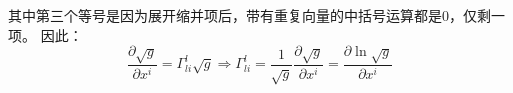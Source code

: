 \documentclass[UTF8,zihao=5]{ctexart}
\newcommand{\bm}[1]{{\mathbf{#1}}}
\newcommand*{\pd}[2]{\frac{\partial #1}{\partial #2}}
\begin{document}
其中第三个等号是因为展开缩并项后，带有重复向量的中括号运算都是0，仅剩一项。
因此：
$$
\pd{\sqrt{g}}{x^i}=\Gamma^l_{li}\sqrt{g}
\Rightarrow
\Gamma^l_{li}=\frac{1}{\sqrt{g}}\pd{\sqrt{g}}{x^i}
=\pd{\ln\sqrt{g}}{x^i}
$$












\end{document}

